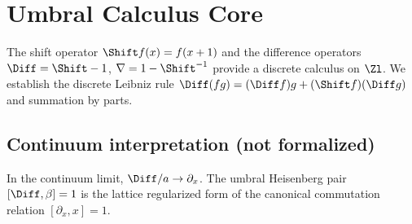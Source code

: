 \chapter{Umbral Calculus Core}
The shift operator $\Shift f(x) = f(x+1)$ and the difference operators $\Diff = \Shift - 1$, $\nabla = 1 - \Shift^{-1}$ provide a discrete calculus on $\Zl$.
We establish the discrete Leibniz rule $\Diff(fg) = (\Diff f)g + (\Shift f)(\Diff g)$ and summation by parts.

\section{Continuum interpretation (not formalized)}
In the continuum limit, $\Diff / a \to \partial_x$. The umbral Heisenberg pair $[\Diff, \beta] = 1$ is the lattice regularized form of the canonical commutation relation $[\partial_x, x] = 1$.

